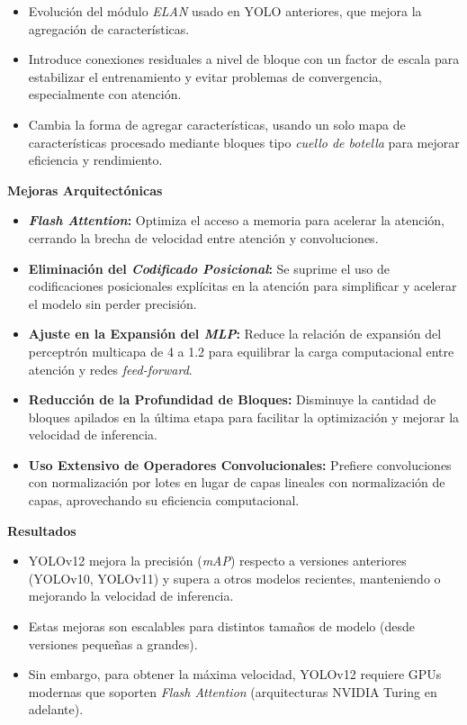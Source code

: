 {\begin{itemize}
    \item Evolución del módulo \emph{ELAN} usado en YOLO anteriores, que mejora la agregación de características.
    \item Introduce conexiones residuales a nivel de bloque con un factor de escala para estabilizar el entrenamiento y evitar problemas de convergencia, especialmente con atención.
    \item Cambia la forma de agregar características, usando un solo mapa de características procesado mediante bloques tipo \emph{cuello de botella} para mejorar eficiencia y rendimiento.
\end{itemize}

\textbf{Mejoras Arquitectónicas}

\begin{itemize}
    \item \textbf{\emph{Flash Attention}:} Optimiza el acceso a memoria para acelerar la atención, cerrando la brecha de velocidad entre atención y convoluciones.
    \item \textbf{Eliminación del \emph{Codificado Posicional}:} Se suprime el uso de codificaciones posicionales explícitas en la atención para simplificar y acelerar el modelo sin perder precisión.
    \item \textbf{Ajuste en la Expansión del \emph{MLP}:} Reduce la relación de expansión del perceptrón multicapa de 4 a 1.2 para equilibrar la carga computacional entre atención y redes \emph{feed-forward}.
    \item \textbf{Reducción de la Profundidad de Bloques:} Disminuye la cantidad de bloques apilados en la última etapa para facilitar la optimización y mejorar la velocidad de inferencia.
    \item \textbf{Uso Extensivo de Operadores Convolucionales:} Prefiere convoluciones con normalización por lotes en lugar de capas lineales con normalización de capas, aprovechando su eficiencia computacional.
\end{itemize}

\textbf{Resultados}

\begin{itemize}
    \item YOLOv12 mejora la precisión (\emph{mAP}) respecto a versiones anteriores (YOLOv10, YOLOv11) y supera a otros modelos recientes, manteniendo o mejorando la velocidad de inferencia.
    \item Estas mejoras son escalables para distintos tamaños de modelo (desde versiones pequeñas a grandes).
    \item Sin embargo, para obtener la máxima velocidad, YOLOv12 requiere GPUs modernas que soporten \emph{Flash Attention} (arquitecturas NVIDIA Turing en adelante).
\end{itemize}




}
